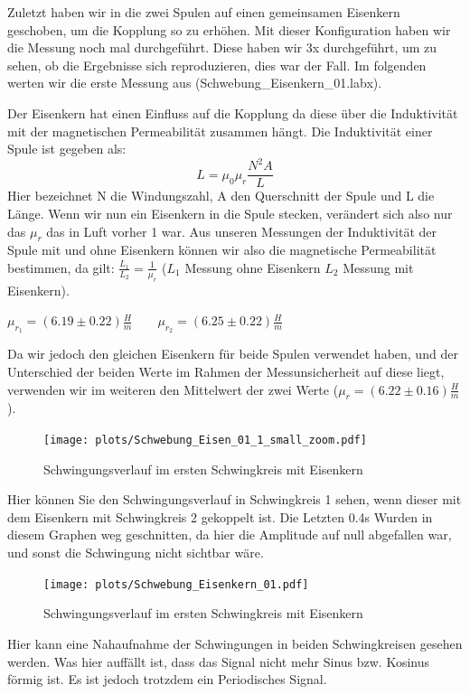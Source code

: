 \documentclass[twoside]{protokoll}
\begin{document}
Zuletzt haben wir in die zwei Spulen auf einen gemeinsamen Eisenkern geschoben, um die Kopplung so zu erhöhen. 
Mit dieser Konfiguration haben wir die Messung noch mal durchgeführt. 
Diese haben wir 3x durchgeführt, um zu sehen, ob die Ergebnisse sich reproduzieren, dies war der Fall.
Im folgenden werten wir die erste Messung aus (Schwebung\_Eisenkern\_01.labx).

Der Eisenkern hat einen Einfluss auf die Kopplung da diese über die Induktivität mit der magnetischen Permeabilität zusammen hängt.
Die Induktivität einer Spule ist gegeben als:
\begin{equation}
L = \mu_0 \mu_r \frac{N^2A}{L}
\end{equation}
Hier bezeichnet N die Windungszahl, A den Querschnitt der Spule und L die Länge.
Wenn wir nun ein Eisenkern in die Spule stecken, verändert sich also nur das $\mu_r$ das in Luft vorher 1 war.
Aus unseren Messungen der Induktivität der Spule mit und ohne Eisenkern können wir also die magnetische Permeabilität bestimmen, da gilt: $\frac{L_1}{L_2} = \frac{1}{\mu_r}$ ($L_1$ Messung ohne Eisenkern $L_2$ Messung mit Eisenkern).
\begin{center}
$\mu_{r_1} = (6.19 \pm 0.22)\frac{H}{m} \qquad \mu_{r_2} = (6.25 \pm 0.22)\frac{H}{m} $
\end{center}

Da wir jedoch den gleichen Eisenkern für beide Spulen verwendet haben, und der Unterschied der beiden Werte im Rahmen der Messunsicherheit auf diese liegt, verwenden wir im weiteren den Mittelwert der zwei Werte ($\mu_r = (6.22 \pm 0.16)\frac{H}{m}$).
\begin{figure}[H]
    \centering
    \texttt{[image: plots/Schwebung\_Eisen\_01\_1\_small\_zoom.pdf]}
    \caption{Schwingungsverlauf im ersten Schwingkreis mit Eisenkern }
\end{figure}

Hier können Sie den Schwingungsverlauf in Schwingkreis 1 sehen, wenn dieser mit dem Eisenkern mit Schwingkreis 2 gekoppelt ist. 
Die Letzten 0.4s Wurden in diesem Graphen weg geschnitten, da hier die Amplitude auf null abgefallen war, und sonst die Schwingung nicht sichtbar wäre.
\begin{figure}[H]
    \centering
    \texttt{[image: plots/Schwebung\_Eisenkern\_01.pdf]}
    \caption{Schwingungsverlauf im ersten Schwingkreis mit Eisenkern }
    \label{Eisenkern beide Schwingungen}
\end{figure}

Hier kann eine Nahaufnahme der Schwingungen in beiden Schwingkreisen gesehen werden. Was hier auffällt ist, dass das Signal nicht mehr Sinus bzw. Kosinus förmig ist. Es ist jedoch trotzdem ein Periodisches Signal.
\end{document}

